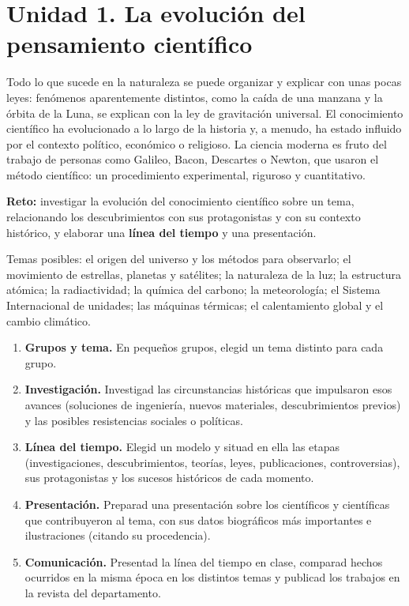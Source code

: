 
\section[Unidad 1. El pensamiento científico]{Unidad 1. La evolución del pensamiento científico}

Todo lo que sucede en la naturaleza se puede organizar y explicar con unas pocas leyes: fenómenos aparentemente distintos, como la caída de una manzana y la órbita de la Luna, se explican con la ley de gravitación universal. El conocimiento científico ha evolucionado a lo largo de la historia y, a menudo, ha estado influido por el contexto político, económico o religioso. La ciencia moderna es fruto del trabajo de personas como Galileo, Bacon, Descartes o Newton, que usaron el método científico: un procedimiento experimental, riguroso y cuantitativo.

\begin{marker}
    \textbf{Reto:} investigar la evolución del conocimiento científico sobre un tema, relacionando los descubrimientos con sus protagonistas y con su contexto histórico, y elaborar una \textbf{línea del tiempo} y una presentación.
\end{marker}

Temas posibles: el origen del universo y los métodos para observarlo; el movimiento de estrellas, planetas y satélites; la naturaleza de la luz; la estructura atómica; la radiactividad; la química del carbono; la meteorología; el Sistema Internacional de unidades; las máquinas térmicas; el calentamiento global y el cambio climático.

\begin{enumerate}[label=\numberballred]
    \item \textbf{Grupos y tema.} En pequeños grupos, elegid un tema distinto para cada grupo.
    \item \textbf{Investigación.} Investigad las circunstancias históricas que impulsaron esos avances (soluciones de ingeniería, nuevos materiales, descubrimientos previos) y las posibles resistencias sociales o políticas.
    \item \textbf{Línea del tiempo.} Elegid un modelo y situad en ella las etapas (investigaciones, descubrimientos, teorías, leyes, publicaciones, controversias), sus protagonistas y los sucesos históricos de cada momento.
    \item \textbf{Presentación.} Preparad una presentación sobre los científicos y científicas que contribuyeron al tema, con sus datos biográficos más importantes e ilustraciones (citando su procedencia).
    \item \textbf{Comunicación.} Presentad la línea del tiempo en clase, comparad hechos ocurridos en la misma época en los distintos temas y publicad los trabajos en la revista del departamento.
\end{enumerate}

